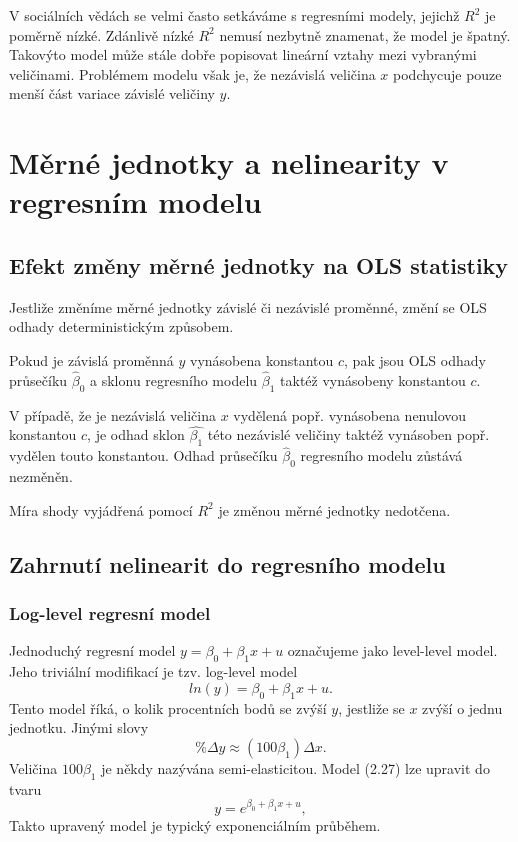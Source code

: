 V sociálních vědách se velmi často setkáváme s regresními modely, jejichž $R^2$ je poměrně nízké. Zdánlivě 
nízké $R^2$ nemusí nezbytně znamenat, že model je špatný. Takovýto model může stále dobře popisovat 
lineární vztahy mezi vybranými veličinami. Problémem modelu však je, že nezávislá veličina $x$ podchycuje 
pouze menší část variace závislé veličiny $y$.

\section{Měrné jednotky a nelinearity v regresním modelu}

\subsection{Efekt změny měrné jednotky na OLS statistiky}

Jestliže změníme měrné jednotky závislé či nezávislé proměnné, změní se OLS odhady deterministickým způsobem.

Pokud je závislá proměnná $y$ vynásobena konstantou $c$, pak jsou OLS odhady průsečíku $\hat{\beta}_0$ a sklonu 
regresního modelu $\hat{\beta}_1$ taktéž vynásobeny konstantou $c$.

V případě, že je nezávislá veličina $x$ vydělená popř. vynásobena nenulovou konstantou $c$, je odhad sklon 
$\hat{\beta_1}$ této nezávislé veličiny taktéž vynásoben popř. vydělen touto konstantou. Odhad průsečíku $\hat{\beta}_0$ regresního modelu zůstává nezměněn.

Míra shody vyjádřená pomocí $R^2$ je změnou měrné jednotky nedotčena.

\subsection{Zahrnutí nelinearit do regresního modelu}

\subsubsection{Log-level regresní model}

Jednoduchý regresní model $y = \beta_0 + \beta_1 x + u$ označujeme jako level-level model. Jeho 
triviální modifikací je tzv. log-level model
\begin{equation}
ln(y) = \beta_0 + \beta_1 x + u.
\end{equation}
Tento model říká, o kolik procentních bodů se zvýší $y$, jestliže se $x$ zvýší o jednu jednotku. Jinými slovy
\begin{equation}
\%\Delta y \approx (100 \beta_1) \Delta x.
\end{equation}
Veličina $100 \beta_1$ je někdy nazývána semi-elasticitou. Model (2.27) lze upravit do tvaru
\begin{equation}
y = e^{\beta_0 + \beta_1 x + u},
\end{equation}
Takto upravený model je typický exponenciálním průběhem.

